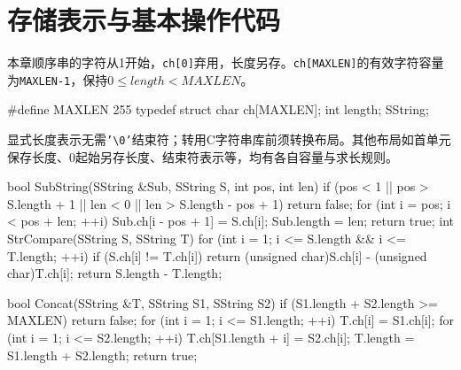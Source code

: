 \section{存储表示与基本操作代码}\label{DS04-storage}

本章顺序串的字符从1开始，\texttt{ch[\allowbreak{}0]\allowbreak{}}弃用，长度另存。\texttt{ch[\allowbreak{}MAXLEN]\allowbreak{}}的有效字符容量为\texttt{MAXLEN-1}，保持\(0\le length<MAXLEN\)。

\par\smallskip\noindent\begin{minipage}{\linewidth}
\begin{codeblock}[language={C++}]
#define MAXLEN 255
typedef struct {
    char ch[MAXLEN];
    int length;
} SString;
\end{codeblock}
\end{minipage}\par\smallskip

显式长度表示无需\texttt{'\textbackslash{}0'}结束符；转用C字符串库前须转换布局。其他布局如首单元保存长度、0起始另存长度、结束符表示等，均有各自容量与求长规则。

\par\smallskip\noindent\begin{minipage}{\linewidth}
\begin{codeblock}[language={C++}]
bool SubString(SString &Sub, SString S, int pos, int len) {
    if (pos < 1 || pos > S.length + 1 || len < 0 ||
        len > S.length - pos + 1)
        return false;
    for (int i = pos; i < pos + len; ++i)
        Sub.ch[i - pos + 1] = S.ch[i];
    Sub.length = len;
    return true;
}
int StrCompare(SString S, SString T) {
    for (int i = 1; i <= S.length && i <= T.length; ++i)
        if (S.ch[i] != T.ch[i])
            return (unsigned char)S.ch[i] -
                   (unsigned char)T.ch[i];
    return S.length - T.length;
}
\end{codeblock}
\end{minipage}\par\smallskip

\par\smallskip\noindent\begin{minipage}{\linewidth}
\begin{codeblock}[language={C++}]
bool Concat(SString &T, SString S1, SString S2) {
    if (S1.length + S2.length >= MAXLEN) return false;
    for (int i = 1; i <= S1.length; ++i)
        T.ch[i] = S1.ch[i];
    for (int i = 1; i <= S2.length; ++i)
        T.ch[S1.length + i] = S2.ch[i];
    T.length = S1.length + S2.length;
    return true;
}
\end{codeblock}
\end{minipage}\par\smallskip

